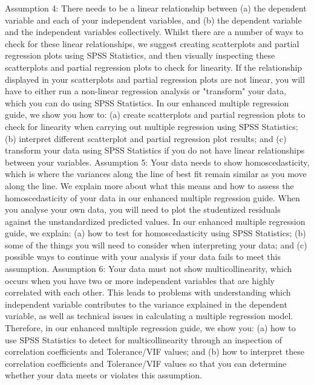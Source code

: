 \documentclass[]{article}
\begin{document}
	Assumption 4: There needs to be a linear relationship between (a) the dependent variable and each of your independent variables, and (b) the dependent variable and the independent variables collectively. Whilst there are a number of ways to check for these linear relationships, we suggest creating scatterplots and partial regression plots using SPSS Statistics, and then visually inspecting these scatterplots and partial regression plots to check for linearity. If the relationship displayed in your scatterplots and partial regression plots are not linear, you will have to either run a non-linear regression analysis or "transform" your data, which you can do using SPSS Statistics. In our enhanced multiple regression guide, we show you how to: (a) create scatterplots and partial regression plots to check for linearity when carrying out multiple regression using SPSS Statistics; (b) interpret different scatterplot and partial regression plot results; and (c) transform your data using SPSS Statistics if you do not have linear relationships between your variables.
	Assumption 5: Your data needs to show homoscedasticity, which is where the variances along the line of best fit remain similar as you move along the line. We explain more about what this means and how to assess the homoscedasticity of your data in our enhanced multiple regression guide. When you analyse your own data, you will need to plot the studentized residuals against the unstandardized predicted values. In our enhanced multiple regression guide, we explain: (a) how to test for homoscedasticity using SPSS Statistics; (b) some of the things you will need to consider when interpreting your data; and (c) possible ways to continue with your analysis if your data fails to meet this assumption.
	Assumption 6: Your data must not show multicollinearity, which occurs when you have two or more independent variables that are highly correlated with each other. This leads to problems with understanding which independent variable contributes to the variance explained in the dependent variable, as well as technical issues in calculating a multiple regression model. Therefore, in our enhanced multiple regression guide, we show you: (a) how to use SPSS Statistics to detect for multicollinearity through an inspection of correlation coefficients and Tolerance/VIF values; and (b) how to interpret these correlation coefficients and Tolerance/VIF values so that you can determine whether your data meets or violates this assumption.
\end{document}
